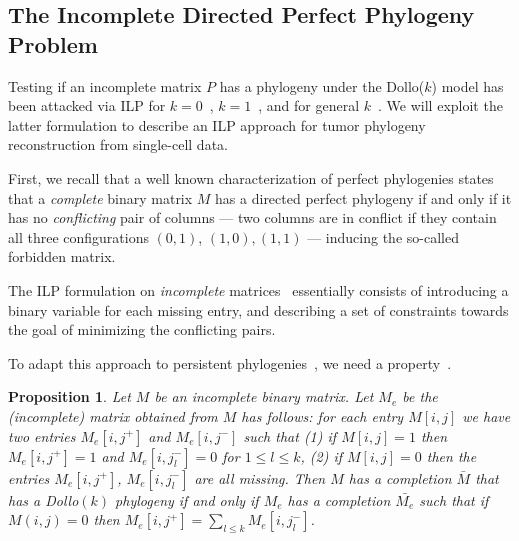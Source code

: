 \documentclass[a4paper,USenglish]{article}
\newtheorem{proposition}[theorem]{Proposition}
\theoremstyle{definition}
\begin{document}
\subsection{The Incomplete Directed Perfect Phylogeny Problem}
\label{sec:idpp}

Testing if an incomplete matrix $P$ has a phylogeny under the Dollo($k$) model has been
attacked via ILP for $k=0$~\cite{Gusfield2007}, $k=1$~\cite{gusfield_persistent_2015}, and
for general $k$~\cite{Bonizzoni:2017:BPP:3107411.3107441}.
We will exploit the latter formulation to describe an ILP approach for tumor phylogeny
reconstruction from single-cell data.


First, we recall that a  well  known characterization  of perfect  phylogenies states
that a \emph{complete}
binary matrix $M$ has a directed perfect phylogeny if and only if
it has  no \emph{conflicting}  pair of columns ---  two columns  are in
conflict  if  they contain  all  three configurations  $(0,1)$,
$(1,0), (1,1)$ --- inducing the so-called forbidden matrix.

The ILP formulation on \emph{incomplete} matrices~\cite{Gusfield2007} essentially consists
of introducing a binary variable for each missing entry, and describing a set of
constraints towards the goal of minimizing the conflicting pairs. 

To adapt this approach to persistent phylogenies~\cite{gusfield_persistent_2015}, we need 
a property~\cite{Bonizzoni:2017:BPP:3107411.3107441}.

\begin{proposition}
  \label{proposition:extended matrix}
  Let $M$ be an incomplete binary matrix.
  Let $M_{e}$ be the (incomplete) matrix obtained from $M$ has follows:
  for each entry $M[i,j]$ we have two entries $M_{e}[i,j^{+}]$ and
$M_{e}[i,j^{-}]$ such that (1) if $M[i,j] = 1$ then $M_{e}[i,j^{+}] = 1$ and
$M_{e}[i,j_{l}^{-}] = 0$ for $1\le l\le k$, (2) if $M[i,j] = 0$ then the entries
$M_{e}[i,j^{+}]$, $ M_{e}[i,j_{l}^{-}]$ are all missing.
Then $M$ has a completion $\bar{M}$ that has a Dollo$(k)$ phylogeny if and only if $M_{e}$
has a completion $\bar{M_{e}}$ such that if $M(i,j)= 0$ then $M_{e}[i,j^{+}] = \sum_{l\le
  k} M_{e}[i,j_{l}^{-}]$.
\end{proposition}
\end{document}
